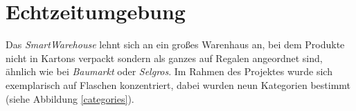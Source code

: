 \section{Echtzeitumgebung}

Das \textit{SmartWarehouse} lehnt sich an ein großes Warenhaus an, bei dem Produkte nicht in Kartons verpackt sondern als ganzes auf Regalen angeordnet sind, ähnlich wie bei \textit{Baumarkt} oder \textit{Selgros}. Im Rahmen des Projektes wurde sich exemplarisch auf Flaschen konzentriert, dabei wurden neun Kategorien bestimmt (siehe Abbildung \ref{categories}). 

\begin{figure}[htb]

\end{figure}
